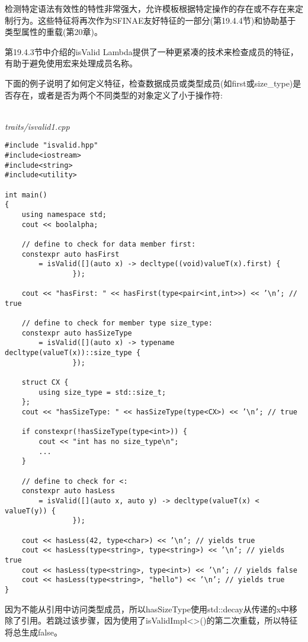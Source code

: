 检测特定语法有效性的特性非常强大，允许模板根据特定操作的存在或不存在来定制行为。这些特征将再次作为SFINAE友好特征的一部分(第19.4.4节)和协助基于类型属性的重载(第20章)。


第19.4.3节中介绍的isValid Lambda提供了一种更紧凑的技术来检查成员的特征，有助于避免使用宏来处理成员名称。

下面的例子说明了如何定义特征，检查数据成员或类型成员(如first或size\_type)是否存在，或者是否为两个不同类型的对象定义了小于操作符:

\hspace*{\fill} \\ %
\noindent
\textit{traits/isvalid1.cpp}
\begin{lstlisting}[style=styleCXX]
#include "isvalid.hpp"
#include<iostream>
#include<string>
#include<utility>

int main()
{
	using namespace std;
	cout << boolalpha;
	
	// define to check for data member first:
	constexpr auto hasFirst
		= isValid([](auto x) -> decltype((void)valueT(x).first) {
				});

	cout << "hasFirst: " << hasFirst(type<pair<int,int>>) << ’\n’; // true
	
	// define to check for member type size_type:
	constexpr auto hasSizeType
		= isValid([](auto x) -> typename decltype(valueT(x))::size_type {
				});
			
	struct CX {
		using size_type = std::size_t;
	};
	cout << "hasSizeType: " << hasSizeType(type<CX>) << ’\n’; // true
	
	if constexpr(!hasSizeType(type<int>)) {
		cout << "int has no size_type\n";
		...
	}

	// define to check for <:
	constexpr auto hasLess
		= isValid([](auto x, auto y) -> decltype(valueT(x) < valueT(y)) {
				});
			
	cout << hasLess(42, type<char>) << ’\n’; // yields true
	cout << hasLess(type<string>, type<string>) << ’\n’; // yields true
	cout << hasLess(type<string>, type<int>) << ’\n’; // yields false
	cout << hasLess(type<string>, "hello") << ’\n’; // yields true
}
\end{lstlisting}

因为不能从引用中访问类型成员，所以hasSizeType使用std::decay从传递的x中移除了引用。若跳过该步骤，因为使用了isValidImpl<>()的第二次重载，所以特征将总生成false。

